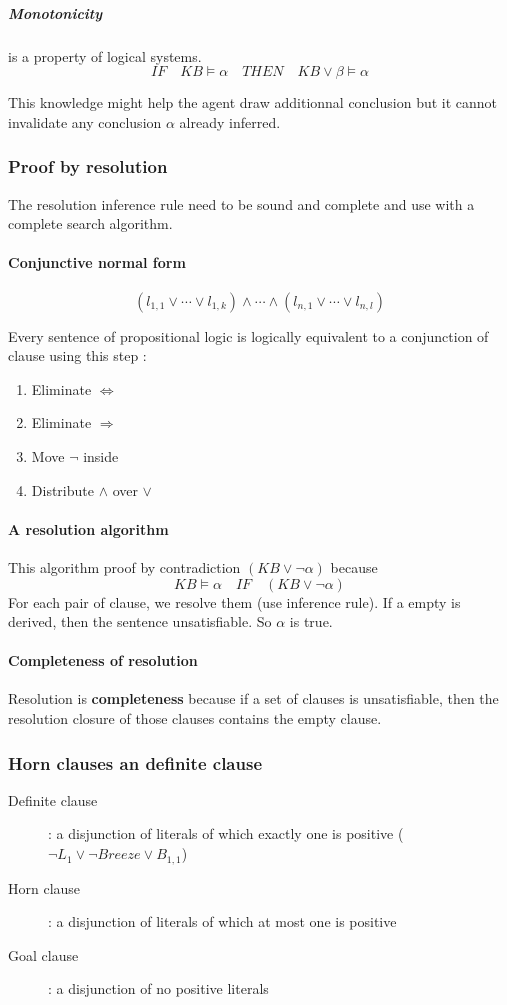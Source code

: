 \subparagraph{\textbf{Monotonicity}} is a property of logical systems.
$$ IF \quad KB \models \alpha \quad THEN \quad KB \vee \beta \models \alpha$$

This knowledge might  help the agent draw additionnal  conclusion but it
cannot invalidate any conclusion $\alpha$ already inferred.


\subsubsection{Proof by resolution}
The resolution inference rule need to be sound and complete and use with a 
complete search algorithm.

\paragraph{Conjunctive normal form} 
$$(l_{1,1} \vee \cdots \vee l_{1,k}) \wedge \cdots \wedge (l_{n,1} \vee \cdots \vee l_{n,l})$$

Every sentence of propositional logic is logically equivalent to a conjunction of clause using this step :
\begin{enumerate}
    \item Eliminate $\Leftrightarrow$
    \item Eliminate $\Rightarrow$
    \item Move $\neg$ inside
    \item Distribute $\wedge$ over $\vee$
\end{enumerate}

\paragraph{A resolution algorithm}
This algorithm proof by contradiction $(KB \vee \neg \alpha)$ because $$KB \models \alpha \quad
 IF \quad (KB \vee \neg \alpha)$$
For each pair of clause, we resolve them (use inference rule). If a empty is derived, then the sentence 
unsatisfiable. So $\alpha$ is true.

\paragraph{Completeness of resolution}
Resolution is \textbf{completeness} because if a set of clauses is unsatisfiable, then
the resolution closure of those clauses contains the empty clause.


\subsubsection{Horn clauses an definite clause}
\begin{description}
    \item[Definite clause] : a disjunction of literals of which exactly one is positive 
        ($\neg L_1 \vee \neg Breeze \vee B_{1,1}$)
    \item[Horn clause] : a disjunction of literals of which at most one is positive
    \item[Goal clause ] : a disjunction of no positive literals
\end{description}

